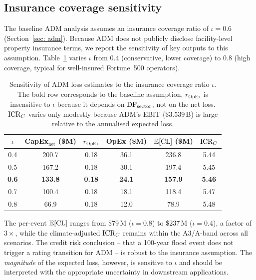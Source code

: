 \subsection{Insurance coverage sensitivity}
\label{ssec: insurance sensitivity}

The baseline ADM analysis assumes an insurance coverage ratio of $\iota = 0.6$ (Section~\ref{sec: adm}). Because ADM does not publicly disclose facility-level property insurance terms, we report the sensitivity of key outputs to this assumption. Table~\ref{tab: insurance sensitivity} varies $\iota$ from 0.4 (conservative, lower coverage) to 0.8 (high coverage, typical for well-insured Fortune~500 operators).

\begin{table}[h!]
\centering
\small
\begin{tabular}{|c|c|c|c|c|c|}
\hline
$\iota$ & \textbf{CapEx$_{\text{net}}$ (\$M)} & $r_{\text{OpEx}}$ & \textbf{OpEx (\$M)} & $\mathbb{E}[\text{CL}]$ (\$M) & $\text{ICR}_C$ \\
\hline
0.4 & 200.7 & 0.18 & 36.1 & 236.8 & 5.44 \\
0.5 & 167.2 & 0.18 & 30.1 & 197.4 & 5.45 \\
\textbf{0.6} & \textbf{133.8} & \textbf{0.18} & \textbf{24.1} & \textbf{157.9} & \textbf{5.46} \\
0.7 & 100.4 & 0.18 & 18.1 & 118.4 & 5.47 \\
0.8 & 66.9 & 0.18 & 12.0 & 78.9 & 5.48 \\
\hline
\end{tabular}
\caption{Sensitivity of ADM loss estimates to the insurance coverage ratio $\iota$. The bold row corresponds to the baseline assumption. $r_{\text{OpEx}}$ is insensitive to $\iota$ because it depends on $\text{DF}_{\text{sector}}$, not on the net loss. $\text{ICR}_C$ varies only modestly because ADM's EBIT (\$3.539\,B) is large relative to the annualised expected loss.}
\label{tab: insurance sensitivity}
\end{table}

The per-event $\mathbb{E}[\text{CL}]$ ranges from \$79\,M ($\iota = 0.8$) to \$237\,M ($\iota = 0.4$), a factor of $3\times$, while the climate-adjusted $\text{ICR}_C$ remains within the A3/A-band across all scenarios. The credit risk conclusion -- that a 100-year flood event does not trigger a rating transition for ADM -- is robust to the insurance assumption. The \emph{magnitude} of the expected loss, however, is sensitive to $\iota$ and should be interpreted with the appropriate uncertainty in downstream applications.
